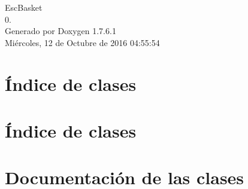 \documentclass[a4paper]{book}
\begin{document}
\hypersetup{pageanchor=false,citecolor=blue}
\begin{titlepage}
\vspace*{7cm}
\begin{center}
{\Large \-Esc\-Basket \\[1ex]\large 0. }\\
\vspace*{1cm}
{\large \-Generado por Doxygen 1.7.6.1}\\
\vspace*{0.5cm}
{\small Miércoles, 12 de Octubre de 2016 04:55:54}\\
\end{center}
\end{titlepage}
\clearemptydoublepage
{}
\tableofcontents
\clearemptydoublepage
{}
\hypersetup{pageanchor=true,citecolor=blue}
\chapter{Índice de clases}

\chapter{Índice de clases}

\chapter{\-Documentación de las clases}





























\printindex
\end{document}
